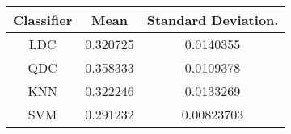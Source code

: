 \begin{tabular}{|c|c|c|}
 \hline 
Classifier & Mean & Standard Deviation. \\ 
 \hline 
LDC & 0.320725 & 0.0140355 \\ 
 \hline 
QDC & 0.358333 & 0.0109378 \\ 
 \hline 
KNN & 0.322246 & 0.0133269 \\ 
 \hline 
SVM & 0.291232 & 0.00823703 \\ 
 \hline 
\end{tabular}
